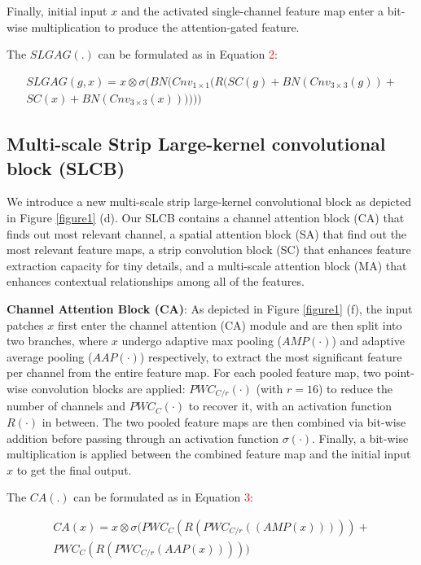 \documentclass[10pt, a4paper, twocolumn]{article}
\begin{document}
Finally, initial input $x$ and the activated single-channel feature map enter a bit-wise multiplication to produce the attention-gated feature.

The $SLGAG(.)$ can be formulated as in Equation \textcolor{red}{2}: 
\begin{scriptsize}
\begin{align}\nonumber
	SLGAG(g,x) = x \otimes \sigma(BN(Cnv_{1\times 1}(R(SC(g) + BN(Cnv_{3\times 3}(g)) + \\SC(x) + BN(Cnv_{3\times 3}(x))))))
\end{align}
\end{scriptsize}

\subsection{Multi-scale Strip Large-kernel convolutional block (SLCB)}

We introduce a new multi-scale strip large-kernel convolutional block as depicted in Figure \textcolor{red}{\ref{figure1}} (d). Our SLCB contains a channel attention block (CA) that finds out most relevant channel, a spatial attention block (SA) that find out the most relevant feature maps, a strip convolution block (SC) that enhances feature extraction capacity for tiny details, and a multi-scale attention block (MA) that enhances contextual relationships among all of the features.

\textbf{Channel Attention Block (CA)}\cite{woo2018cbam}: As depicted in Figure \textcolor{red}{\ref{figure1}} (f), the input patches $x$ first enter the channel attention (CA) module and are then split into two branches, where $x$ undergo adaptive max pooling\cite{he2014spatial} ($AMP(\cdot)$) and adaptive average pooling ($AAP(\cdot)$)\cite{he2014spatial} respectively, to extract the most significant feature per channel from the entire feature map. For each pooled feature map, two point-wise convolution blocks\cite{lin2013network} are applied: $PWC_{C/r}(\cdot)$ (with $r=16$) to reduce the number of channels and $PWC_C(\cdot)$ to recover it, with an activation function $R(\cdot)$ in between. The two pooled feature maps are then combined via bit-wise addition before passing through an activation function $\sigma(\cdot)$. Finally, a bit-wise multiplication is applied between the combined feature map and the initial input $x$ to get the final output.

The $CA(.)$ can be formulated as in Equation \textcolor{red}{3}:
\begin{scriptsize}   
\begin{align}
  CA(x) = x \otimes \sigma(PWC_{C}(R(PWC_{C/r}((AMP(x))))) + \nonumber
  \\PWC_{C}(R(PWC_{C/r}(AAP(x)))))
\end{align}
\end{scriptsize}
\end{document}
